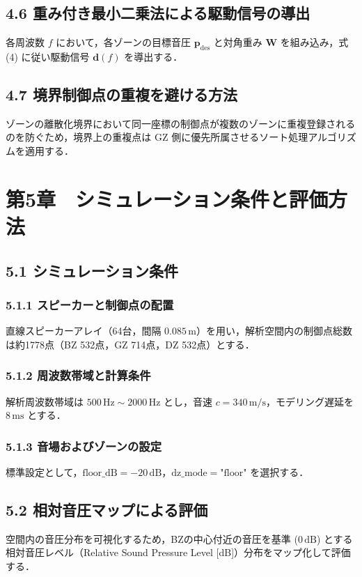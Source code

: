 \documentclass[11pt, a4paper]{article}
\begin{document}
\subsection{4.6 重み付き最小二乗法による駆動信号の導出}
各周波数 $f$ において，各ゾーンの目標音圧 $\mathbf{p}_{\mathrm{des}}$ と対角重み $\mathbf{W}$ を組み込み，式 (4) に従い駆動信号 $\mathbf{d}(f)$ を導出する．

\subsection{4.7 境界制御点の重複を避ける方法}
ゾーンの離散化境界において同一座標の制御点が複数のゾーンに重複登録されるのを防ぐため，境界上の重複点は GZ 側に優先所属させるソート処理アルゴリズムを適用する．

\section{第5章　シミュレーション条件と評価方法}

\subsection{5.1 シミュレーション条件}
\subsubsection{5.1.1 スピーカーと制御点の配置}
直線スピーカーアレイ（64台，間隔 $0.085\,\mathrm{m}$）を用い，解析空間内の制御点総数は約1778点（BZ 532点，GZ 714点，DZ 532点）とする．

\subsubsection{5.1.2 周波数帯域と計算条件}
解析周波数帯域は $500\,\mathrm{Hz} \sim 2000\,\mathrm{Hz}$ とし，音速 $c = 340\,\mathrm{m/s}$，モデリング遅延を $8\,\mathrm{ms}$ とする．

\subsubsection{5.1.3 音場およびゾーンの設定}
標準設定として，$\mathrm{floor\_dB} = -20\,\mathrm{dB}$，$\mathrm{dz\_mode} = \text{"floor"}$ を選択する．

\subsection{5.2 相対音圧マップによる評価}
空間内の音圧分布を可視化するため，BZの中心付近の音圧を基準 ($0\,\mathrm{dB}$) とする相対音圧レベル（Relative Sound Pressure Level [dB]）分布をマップ化して評価する．
\end{document}
